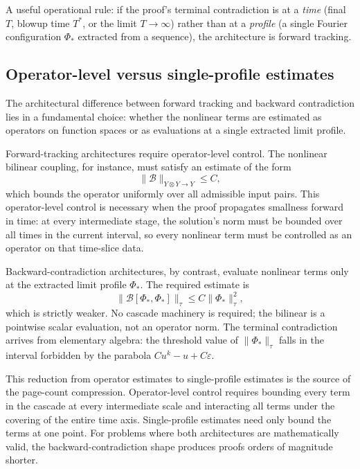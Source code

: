 \documentclass[11pt]{article}
\theoremstyle{plain}
\theoremstyle{definition}
\theoremstyle{remark}
\begin{document}
A useful operational rule: if the proof's terminal contradiction is at a
\textit{time} (final \(T\), blowup time \(T^*\), or the limit \(T \to \infty\))
rather than at a \textit{profile} (a single Fourier configuration \(\Phi_*\)
extracted from a sequence), the architecture is forward tracking.

\subsection{Operator-level versus single-profile estimates}
\label{subsec:comparative-architecture}

The architectural difference between forward tracking and backward contradiction
lies in a fundamental choice: whether the nonlinear terms are estimated as
operators on function spaces or as evaluations at a single extracted limit
profile.

Forward-tracking architectures require operator-level control. The nonlinear
bilinear coupling, for instance, must satisfy an estimate of the form
\[
  \|\mathcal{B}\|_{Y \otimes Y \to Y} \leq C,
\]
which bounds the operator uniformly over all admissible input pairs. This
operator-level control is necessary when the proof propagates smallness forward
in time: at every intermediate stage, the solution's norm must be bounded over
all times in the current interval, so every nonlinear term must be controlled
as an operator on that time-slice data.

Backward-contradiction architectures, by contrast, evaluate nonlinear terms
only at the extracted limit profile \(\Phi_*\). The required estimate is
\[
  \|\mathcal{B}[\Phi_*, \Phi_*]\|_\tau \leq C\|\Phi_*\|_\tau^2,
\]
which is strictly weaker. No cascade machinery is required; the bilinear is a
pointwise scalar evaluation, not an operator norm. The terminal contradiction
arrives from elementary algebra: the threshold value of \(\|\Phi_*\|_\tau\)
falls in the interval forbidden by the parabola \(Cu^k - u + C\varepsilon\).

This reduction from operator estimates to single-profile estimates is the
source of the page-count compression. Operator-level control requires
bounding every term in the cascade at every intermediate scale and interacting
all terms under the covering of the entire time axis. Single-profile estimates
need only bound the terms at one point. For problems where both architectures
are mathematically valid, the backward-contradiction shape produces proofs orders
of magnitude shorter.
\end{document}
